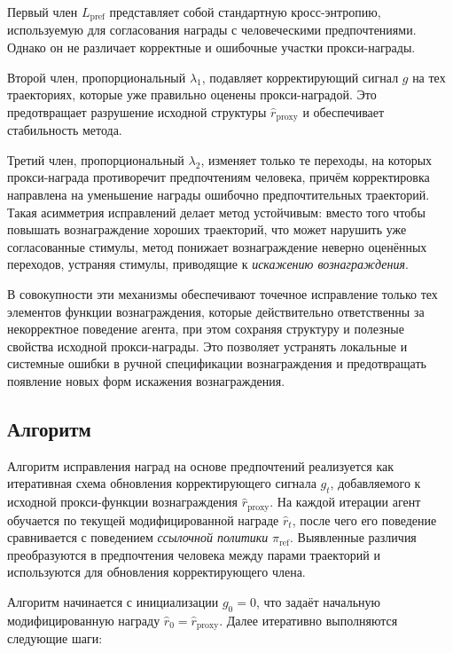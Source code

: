 Первый член $L_{\text{pref}}$ представляет собой стандартную кросс-энтропию, 
используемую для согласования награды с человеческими предпочтениями. 
Однако он не различает корректные и ошибочные участки прокси-награды. 

Второй член, пропорциональный $\lambda_1$, подавляет корректирующий сигнал 
$g$ на тех траекториях, которые уже правильно оценены прокси-наградой. 
Это предотвращает разрушение исходной структуры $\hat r_{\text{proxy}}$ и 
обеспечивает стабильность метода. 

Третий член, пропорциональный $\lambda_2$, изменяет только те переходы, 
на которых прокси-награда противоречит предпочтениям человека, причём 
корректировка направлена на уменьшение награды ошибочно предпочтительных 
траекторий. Такая асимметрия исправлений делает метод устойчивым: вместо того 
чтобы повышать вознаграждение хороших траекторий, что может нарушить уже 
согласованные стимулы, метод понижает вознаграждение неверно оценённых переходов, 
устраняя стимулы, приводящие к \emph{искажению вознаграждения}.

В совокупности эти механизмы обеспечивают точечное исправление только тех 
элементов функции вознаграждения, которые действительно ответственны за 
некорректное поведение агента, при этом сохраняя структуру и полезные 
свойства исходной прокси-награды. Это позволяет устранять 
локальные и системные ошибки в ручной спецификации вознаграждения и 
предотвращать появление новых форм искажения вознаграждения.


\subsection{Алгоритм}

Алгоритм исправления наград на основе предпочтений реализуется как итеративная 
схема обновления корректирующего сигнала $g_t$, добавляемого к исходной 
прокси-функции вознаграждения $\hat r_{\text{proxy}}$. На каждой 
итерации агент обучается по текущей модифицированной награде $\hat r_t$, 
после чего его поведение сравнивается с поведением 
\emph{ссылочной политики} $\pi_{\text{ref}}$. Выявленные различия 
преобразуются в предпочтения человека между парами траекторий и используются 
для обновления корректирующего члена.

Алгоритм начинается с инициализации $g_0 = 0$, что задаёт начальную 
модифицированную награду $\hat r_0 = \hat r_{\text{proxy}}$. Далее 
итеративно выполняются следующие шаги:

